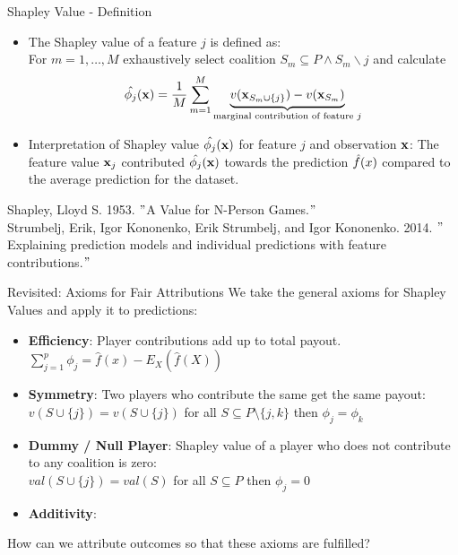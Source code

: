 \documentclass[11pt,compress,t,notes=noshow, xcolor=table]{beamer}
\begin{document}
\begin{vbframe}{Shapley Value - Definition}
\begin{itemize}
  \item The Shapley value of a feature $j$ is defined as:\\ 
  For $m = 1, \dots, M$ exhaustively select coalition $S_m \subseteq P \land S_m \backslash j$  and calculate
$$ \hat{\phi_{j}}(\xv) = \frac{1}{M} \sum_{m=1}^{M} \underbrace{v(\xv_{S_m \cup \{j \} }) - v(\xv_{S_m})}_{\text{marginal contribution of feature $j$}} $$
\lz
  \item Interpretation of Shapley value $\hat{\phi_{j}}(\xv)$ for feature $j$ and observation $\xv$: 
  The feature value $\xv_{j}$ contributed $\hat{\phi_{j}}(\xv)$ towards the prediction $\fh(x)$ compared to the average prediction for the dataset.
\end{itemize}
\lz
\tiny
Shapley, Lloyd S. 1953. $"$A Value for N-Person Games.$"$\\
\vspace{0.2cm}
Strumbelj, Erik, Igor Kononenko, Erik Strumbelj, and Igor Kononenko. 2014. $"$Explaining prediction models and individual predictions with feature contributions.$"$

\end{vbframe}


\begin{vbframe}{Revisited: Axioms for Fair Attributions}
  We take the general axioms for Shapley Values and apply it to predictions:
  \begin{itemize}
    \item \textbf{Efficiency}: Player contributions add up to total payout.
      $\sum\nolimits_{j=1}^p\phi_j=\hat{f}(x)-E_X(\hat{f}(X))$
    \item \textbf{Symmetry}: Two players who contribute the same get the same payout: \\
      $v(S\cup\{j\}) = v(S\cup\{j\})$ for all $S \subseteq P\setminus\{j,k\}$ then $\phi_{j}=\phi_{k}$
    \item \textbf{Dummy / Null Player}: Shapley value of a player who does not contribute to any coalition is zero: \\
      $val(S\cup\{j\})=val(S)$ for all $S \subseteq P$ then $\phi_j=0$
    \item \textbf{Additivity}: 
  \end{itemize}
How can we attribute outcomes so that these axioms are fulfilled?
\end{vbframe}
\end{document}
